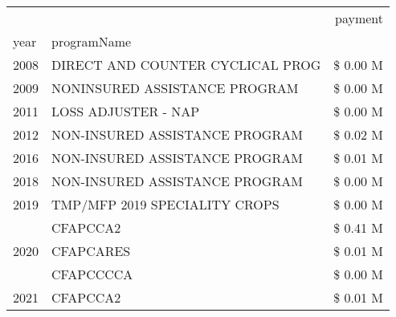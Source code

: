\begin{tabular}{llr}
\toprule
 &  & payment \\
year & programName &  \\
\midrule
2008 & DIRECT AND COUNTER CYCLICAL PROG & \$ 0.00 M \\
\cline{1-3}
2009 & NONINSURED ASSISTANCE PROGRAM & \$ 0.00 M \\
\cline{1-3}
2011 & LOSS ADJUSTER - NAP & \$ 0.00 M \\
\cline{1-3}
2012 & NON-INSURED ASSISTANCE PROGRAM & \$ 0.02 M \\
\cline{1-3}
2016 & NON-INSURED ASSISTANCE PROGRAM & \$ 0.01 M \\
\cline{1-3}
2018 & NON-INSURED ASSISTANCE PROGRAM & \$ 0.00 M \\
\cline{1-3}
2019 & TMP/MFP 2019 SPECIALITY CROPS & \$ 0.00 M \\
\cline{1-3}
\multirow[t]{3}{*}{2020} & CFAPCCA2 & \$ 0.41 M \\
 & CFAPCARES & \$ 0.01 M \\
 & CFAPCCCCA & \$ 0.00 M \\
\cline{1-3}
2021 & CFAPCCA2 & \$ 0.01 M \\
\cline{1-3}
\bottomrule
\end{tabular}
